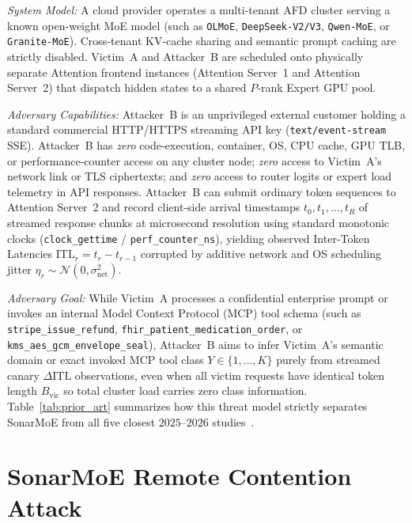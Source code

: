 \documentclass[10pt,journal,compsoc]{IEEEtran}
\def\SM{SonarMoE}%
\theoremstyle{definition}
\theoremstyle{remark}
\newcommand{\SM}{\textsc{SonarMoE}}
\begin{document}
\emph{System Model:} A cloud provider operates a multi-tenant AFD cluster serving a known open-weight MoE model (such as \texttt{OLMoE}, \texttt{DeepSeek-V2/V3}, \texttt{Qwen-MoE}, or \texttt{Granite-MoE}). Cross-tenant KV-cache sharing and semantic prompt caching are strictly disabled. Victim~A and Attacker~B are scheduled onto physically separate Attention frontend instances (Attention Server~1 and Attention Server~2) that dispatch hidden states to a shared $P$-rank Expert GPU pool.

\emph{Adversary Capabilities:} Attacker~B is an unprivileged external customer holding a standard commercial HTTP/HTTPS streaming API key (\texttt{text/event-stream} SSE). Attacker~B has \emph{zero} code-execution, container, OS, CPU cache, GPU TLB, or performance-counter access on any cluster node; \emph{zero} access to Victim~A's network link or TLS ciphertexts; and \emph{zero} access to router logits or expert load telemetry in API responses. Attacker~B can submit ordinary token sequences to Attention Server~2 and record client-side arrival timestamps $t_0, t_1, \dots, t_R$ of streamed response chunks at microsecond resolution using standard monotonic clocks (\texttt{clock\_gettime} / \texttt{perf\_counter\_ns}), yielding observed Inter-Token Latencies $\mathrm{ITL}_r = t_r - t_{r-1}$ corrupted by additive network and OS scheduling jitter $\eta_r \sim \mathcal{N}(0, \sigma_{\mathrm{net}}^2)$.

\emph{Adversary Goal:} While Victim~A processes a confidential enterprise prompt or invokes an internal Model Context Protocol (MCP) tool schema (such as \texttt{stripe\_issue\_refund}, \texttt{fhir\_patient\_medication\_order}, or \texttt{kms\_aes\_gcm\_envelope\_seal}), Attacker~B aims to infer Victim~A's semantic domain or exact invoked MCP tool class $Y \in \{1, \dots, K\}$ purely from streamed canary $\Delta\mathrm{ITL}$ observations, even when all victim requests have identical token length $B_{\mathrm{vic}}$ so total cluster load carries zero class information. Table~\ref{tab:prior_art} summarizes how this threat model strictly separates \SM{} from all five closest $2025$--$2026$ studies~\cite{wu2025promptpeek,zheng2025inputsnatch,microsoft2025whisperleak,ding2025moecho,patel2026routingmembership,liu2026straggler}.

\section{SonarMoE Remote Contention Attack}\label{sec:attack}
\end{document}
